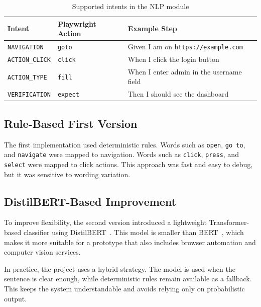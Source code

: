 \begin{table}[H]
	\centering
	\caption{Supported intents in the NLP module}
	\label{tab:supported_intents}
	\renewcommand{\arraystretch}{1.3}
	\small
	\begin{tabularx}{\textwidth}{|l|l|X|}
		\hline
		\rowcolor{gray!20}
		\textbf{Intent} & \textbf{Playwright Action} & \textbf{Example Step} \\ \hline
		\texttt{NAVIGATION} & \texttt{goto} & Given I am on \texttt{https://example.com} \\ \hline
		\texttt{ACTION\_CLICK} & \texttt{click} & When I click the login button \\ \hline
		\texttt{ACTION\_TYPE} & \texttt{fill} & When I enter admin in the username field \\ \hline
		\texttt{VERIFICATION} & \texttt{expect} & Then I should see the dashboard \\ \hline
	\end{tabularx}
\end{table}

\subsection{Rule-Based First Version}
\label{subsec:rule_based_classification}

The first implementation used deterministic rules. Words such as \texttt{open}, \texttt{go to}, and \texttt{navigate} were mapped to navigation. Words such as \texttt{click}, \texttt{press}, and \texttt{select} were mapped to click actions. This approach was fast and easy to debug, but it was sensitive to wording variation.

\subsection{DistilBERT-Based Improvement}
\label{subsec:distilbert_classification}

To improve flexibility, the second version introduced a lightweight Transformer-based classifier using DistilBERT~\cite{distilbert_paper}. This model is smaller than BERT~\cite{bert_paper}, which makes it more suitable for a prototype that also includes browser automation and computer vision services.

In practice, the project uses a hybrid strategy. The model is used when the sentence is clear enough, while deterministic rules remain available as a fallback. This keeps the system understandable and avoids relying only on probabilistic output.

